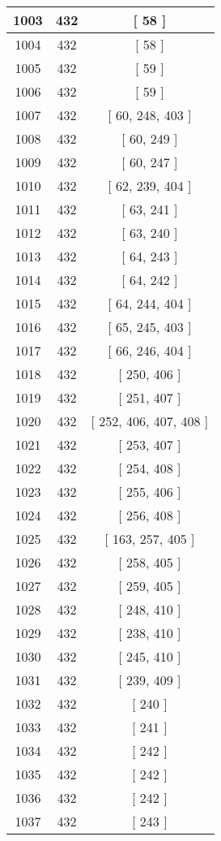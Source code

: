 \begin{center}
\begin{longtable}[H]{|| c c c ||}
1003 & 432 & [ 58 ]
\\\hline
1004 & 432 & [ 58 ]
\\\hline
1005 & 432 & [ 59 ]
\\\hline
1006 & 432 & [ 59 ]
\\\hline
1007 & 432 & [ 60, 248, 403 ]
\\\hline
1008 & 432 & [ 60, 249 ]
\\\hline
1009 & 432 & [ 60, 247 ]
\\\hline
1010 & 432 & [ 62, 239, 404 ]
\\\hline
1011 & 432 & [ 63, 241 ]
\\\hline
1012 & 432 & [ 63, 240 ]
\\\hline
1013 & 432 & [ 64, 243 ]
\\\hline
1014 & 432 & [ 64, 242 ]
\\\hline
1015 & 432 & [ 64, 244, 404 ]
\\\hline
1016 & 432 & [ 65, 245, 403 ]
\\\hline
1017 & 432 & [ 66, 246, 404 ]
\\\hline
1018 & 432 & [ 250, 406 ]
\\\hline
1019 & 432 & [ 251, 407 ]
\\\hline
1020 & 432 & [ 252, 406, 407, 408 ]
\\\hline
1021 & 432 & [ 253, 407 ]
\\\hline
1022 & 432 & [ 254, 408 ]
\\\hline
1023 & 432 & [ 255, 406 ]
\\\hline
1024 & 432 & [ 256, 408 ]
\\\hline
1025 & 432 & [ 163, 257, 405 ]
\\\hline
1026 & 432 & [ 258, 405 ]
\\\hline
1027 & 432 & [ 259, 405 ]
\\\hline
1028 & 432 & [ 248, 410 ]
\\\hline
1029 & 432 & [ 238, 410 ]
\\\hline
1030 & 432 & [ 245, 410 ]
\\\hline
1031 & 432 & [ 239, 409 ]
\\\hline
1032 & 432 & [ 240 ]
\\\hline
1033 & 432 & [ 241 ]
\\\hline
1034 & 432 & [ 242 ]
\\\hline
1035 & 432 & [ 242 ]
\\\hline
1036 & 432 & [ 242 ]
\\\hline
1037 & 432 & [ 243 ]
\\\hline

\end{longtable}
\end{center}

